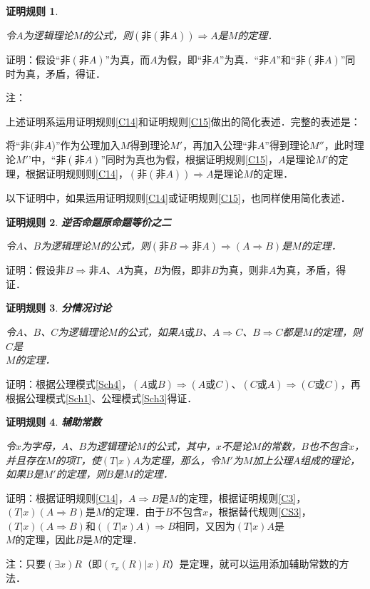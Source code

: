 \documentclass[12pt, a4paper, oneside]{book}
\newtheorem{C}{证明规则}
\begin{document}
			\begin{C}\label{C16}
				\hfill\par
				令$A$为逻辑理论$M$的公式，则$(\text{非}(\text{非}A))\Rightarrow A$是$M$的定理．
			\end{C}
			证明：假设“$\text{非}(\text{非}A)$”为真，而$A$为假，即“$\text{非}A$”为真．“$\text{非}A$”和“$\text{非}(\text{非}A)$”同时为真，矛盾，得证．
			\par
			注：
			\par
			上述证明系运用证明规则\ref{C14}和证明规则\ref{C15}做出的简化表述．完整的表述是：
			\par
			将“$\text{非}(\text{非}A$)”作为公理加入$M$得到理论$M'$，再加入公理“$\text{非}A$”得到理论$M''$，此时理论$M'$'中，“$\text{非}(\text{非}A)$”同时为真也为假，根据证明规则\ref{C15}，$A$是理论$M'$的定理，根据证明规则则\ref{C14}，$(\text{非}(\text{非}A))\Rightarrow A$是理论$M$的定理．
			\par
			以下证明中，如果运用证明规则\ref{C14}或证明规则\ref{C15}，也同样使用简化表述．

			\begin{C}\label{C17}
				\textbf{逆否命题原命题等价之二}
				\par
				令$A$、$B$为逻辑理论$M$的公式，则$(\text{非}B\Rightarrow \text{非}A)\Rightarrow (A\Rightarrow B)$是$M$的定理．
			\end{C}
			证明：假设$\text{非}B\Rightarrow \text{非}A$、$A$为真，$B$为假，即$\text{非}B$为真，则$\text{非}A$为真，矛盾，得证．

			\begin{C}\label{C18}
				\textbf{分情况讨论}
				\par
				令$A$、$B$、$C$为逻辑理论$M$的公式，如果$A\text{或}B$、$A\Rightarrow C$、$B\Rightarrow C$都是$M$的定理，则$C$是\\$M$的定理．
			\end{C}
			证明：根据公理模式\ref{Sch4}，$(A\text{或}B)\Rightarrow (A\text{或}C)$、$(C\text{或}A)\Rightarrow (C\text{或}C)$，再根据公理模式\ref{Sch1}、公理模式\ref{Sch3}得证．

			\begin{C}\label{C19}
				\textbf{辅助常数}
				\par
				令$x$为字母，$A$、$B$为逻辑理论$M$的公式，其中，$x$不是论$M$的常数，$B$也不包含$x$，并且存在$M$的项$T$，使$(T|x)A$为定理，那么，令$M'$为$M$加上公理$A$组成的理论，如果$B$是$M'$的定理，则$B$是$M$的定理．
			\end{C}
			证明：根据证明规则\ref{C14}，$A\Rightarrow B$是$M$的定理，根据证明规则\ref{C3}，$(T|x)(A\Rightarrow B)$是$M$的定理．由于$B$不包含$x$，根据替代规则\ref{CS3}，$(T|x)(A\Rightarrow B)$和$((T|x)A)\Rightarrow B$相同，又因为$(T|x)A$是\\$M$的定理，因此$B$是$M$的定理．
			\par
			注：只要$(\exists x)R$（即$(\tau_x(R)|x)R$）是定理，就可以运用添加辅助常数的方法．
\end{document}
